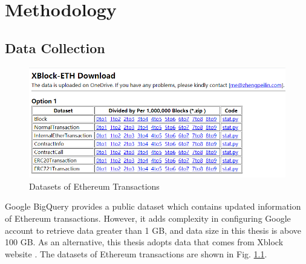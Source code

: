 %
\chapter{Methodology}
\label{sec:methodology}


\section{Data Collection}
\label{sec:methodology:data}






\begin{figure}[htb]
	\includegraphics[width=\textwidth]{gfx/data.png}
	\caption{Datasets of Ethereum Transactions}
	\label{fig:data}
\end{figure}

Google BigQuery provides a public dataset which contains updated information of Ethereum transactions. However, it adds complexity in configuring Google account to retrieve data greater than 1 GB, and data size in this thesis is above 100 GB. As an alternative, this thesis adopts data that comes from Xblock website \cite{21}. The datasets of Ethereum transactions are shown in Fig. \ref{fig:data}.


